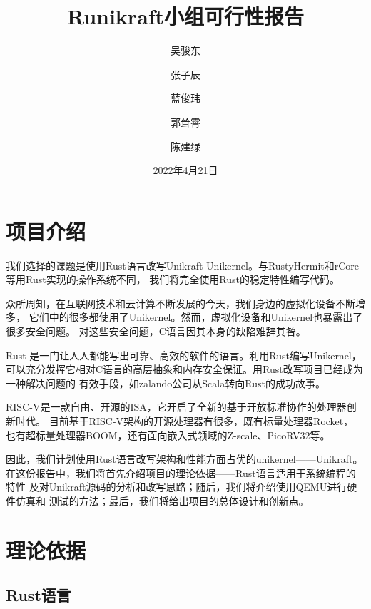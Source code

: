 \documentclass{../runikraft-report}
\renewcommand{\today}{2022年4月21日}
\begin{document}
\title{\bfseries Runikraft小组\quad 可行性报告}
\author{吴骏东\and 张子辰\and 蓝俊玮\and 郭耸霄\and 陈建绿}
\date{\today}
\maketitle

\tableofcontents
\section{项目介绍}
我们选择的课题是使用Rust语言改写Unikraft Unikernel。与RustyHermit和rCore等用Rust实现的操作系统不同，
我们将完全使用Rust的稳定特性编写代码。

众所周知，在互联网技术和云计算不断发展的今天，我们身边的虚拟化设备不断增多，
它们中的很多都使用了Unikernel。然而，虚拟化设备和Unikernel也暴露出了很多安全问题。
对这些安全问题，C语言因其本身的缺陷难辞其咎。

Rust 是一门让人人都能写出可靠、高效的软件的语言。\cite{7}利用Rust编写Unikernel，
可以充分发挥它相对C语言的高层抽象和内存安全保证。用Rust改写项目已经成为一种解决问题的
有效手段，如zalando公司从Scala转向Rust的成功故事。\cite{3}

RISC-V是一款自由、开源的ISA，它开启了全新的基于开放标准协作的处理器创新时代。\cite{0}
目前基于RISC-V架构的开源处理器有很多，既有标量处理器Rocket，
也有超标量处理器BOOM，还有面向嵌入式领域的Z-scale、PicoRV32等。\cite{2}

因此，我们计划使用Rust语言改写架构和性能方面占优的unikernel——Unikraft。
在这份报告中，我们将首先介绍项目的理论依据——Rust语言适用于系统编程的特性
及对Unikraft源码的分析和改写思路；随后，我们将介绍使用QEMU进行硬件仿真和
测试的方法；最后，我们将给出项目的总体设计和创新点。
\section{理论依据}
\subsection{Rust语言}
\end{document}
